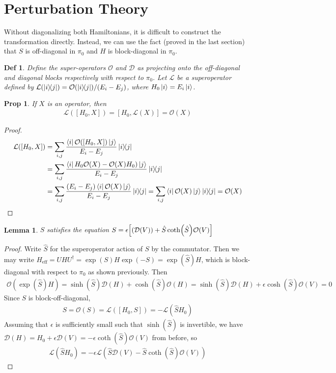 \documentclass[11pt]{article}
\newtheorem{defn}{Def}
\newtheorem{prop}{Prop}
\newtheorem{lem}{Lemma}
\begin{document}
\section{Perturbation Theory}
Without diagonalizing both Hamiltonians, it is difficult to construct the transformation directly. Instead, we can use the fact (proved in the last section) that $S$ is off-diagonal in $\pi_0$ and $H$ is block-diagonal in $\pi_0$. 
\begin{defn}
    Define the super-operators $\mathcal O$ and $\mathcal D$ as projecting onto the off-diagonal and diagonal blocks respectively with respect to $\pi_0$. Let $\mathcal L$ be a superoperator defined by $\mathcal L(\ketbra{i}{j}) = \mathcal O(\ketbra{i}{j})/(E_i - E_j)$, where $H_0\ket{i} = E_i\ket{i}$. 
\end{defn}
\begin{prop}
    If $X$ is an operator, then
    \begin{align}
        \mathcal L([H_0, X]) = [H_0, \mathcal L(X)] = \mathcal O(X)
    \end{align}
\end{prop}
\begin{proof}
    \begin{align}
        \mathcal L([H_0, X]) &= \sum_{i,j}\frac{\bra{i}\mathcal O([H_0, X])\ket{j}}{E_i - E_j}\ketbra{i}{j} \\
                             &= \sum_{i,j}\frac{\bra{i}H_0\mathcal O(X) - \mathcal O(X) H_0)\ket{j}}{E_i - E_j}\ketbra{i}{j} \\
                             &=\sum_{i,j}\frac{(E_i-E_j)\bra{i}\mathcal O(X)\ket{j}}{E_i - E_j}\ketbra{i}{j} = \sum_{i,j}\bra{i}\mathcal O(X)\ket{j}\ketbra{i}{j}  = \mathcal O(X)
    \end{align}
\end{proof}
\begin{lem}
    $S$ satisfies the equation $S = \epsilon \qty[(\mathcal D(V)) + \hat S \coth(\hat S)\mathcal O(V)]$
\end{lem}
\begin{proof}
    Write $\hat S$ for the superoperator action of $S$ by the commutator. Then we may write $H_{\text{eff}} = UHU^\dagger = \exp(S)H\exp(-S) = \exp(\hat S)H$, which is block-diagonal with respect to $\pi_0$ as shown previously. Then
\begin{align}
    \mathcal O(\exp(\hat S)H) = \sinh(\hat S)\mathcal D(H) + \cosh(\hat S)\mathcal O(H) = \sinh(\hat S)\mathcal D(H) + \epsilon\cosh(\hat S)\mathcal O(V) = 0
\end{align}
Since $S$ is block-off-diagonal,
\begin{align}
    S = \mathcal O(S) = \mathcal L([H_0, S]) = -\mathcal L(\hat S H_0)
\end{align}
Assuming that $\epsilon$ is sufficiently small such that $\sinh(\hat S)$ is invertible, we have $\mathcal D(H) = H_0 + \epsilon \mathcal D(V) = -\epsilon \coth(\hat S)\mathcal O(V)$ from before, so
\begin{align}
\mathcal L(\hat S H_0) = -\epsilon\mathcal L(\hat S\mathcal D(V) - \hat S\coth(\hat S)\mathcal O(V))
\end{align}
\end{proof}
\end{document}
